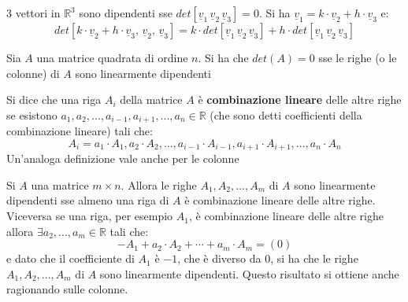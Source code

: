 \documentclass[a4paper,12pt, oneside]{book}
\begin{document}
3 vettori in $\mathbb{R}^3$ sono dipendenti sse $det[\underline{v}_1\, \underline{v}_2\, \underline{v}_3]=0$. Si ha $\underline{v}_1= k\cdot\underline{v}_2+h\cdot \underline{v}_3$ e:
$$det[k\cdot\underline{v}_2+h\cdot \underline{v}_3,\, \underline{v}_2,\, \underline{v}_3]=k\cdot det[\underline{v}_1\, \underline{v}_2\, \underline{v}_3]+h\cdot det[\underline{v}_1\, \underline{v}_2\, \underline{v}_3]$$
\begin{teorema}
	Sia $A$ una matrice quadrata di ordine $n$. Si ha che $det(A)=0$ sse le righe (o le colonne) di $A$ sono linearmente dipendenti
\end{teorema}
\begin{definizione}
	Si dice che una riga $A_i$ della matrice $A$  è \textbf{combinazione lineare} delle altre righe se esistono $a_1,a_2,...,a_{i-1},a_{i+1},...,a_n\in\mathbb{R}$ (che sono detti coefficienti della combinazione lineare) tali che:
	$$A_i=a_1\cdot A_1,a_2\cdot A_2,...,a_{i-1}\cdot A_{i-1},a_{i+1}\cdot A_{i+1},...,a_n\cdot A_n$$
	Un'analoga definizione vale anche per le colonne
\end{definizione}
\begin{teorema}
	Si $A$ una matrice $m\times n$. Allora le righe $A_1,A_2,...,A_m$ di $A$ sono linearmente dipendenti sse almeno una riga di $A$ è combinazione lineare delle altre righe.\\
	Viceversa se una riga, per esempio $A_1$, è combinazione lineare delle altre righe allora $\exists a_2,...,a_m\in\mathbb{R}$ tali che:
	$$-A_1+a_2\cdot A_2+\cdots+a_m\cdot A_m=(0)$$
	e dato che il coefficiente di $A_1$ è $-1$, che è diverso da $0$, si ha che le righe $A_1,A_2,...,A_m$ di $A$ sono linearmente dipendenti.
	Questo risultato si ottiene anche ragionando sulle colonne.
\end{teorema}
\newpage
\end{document}
